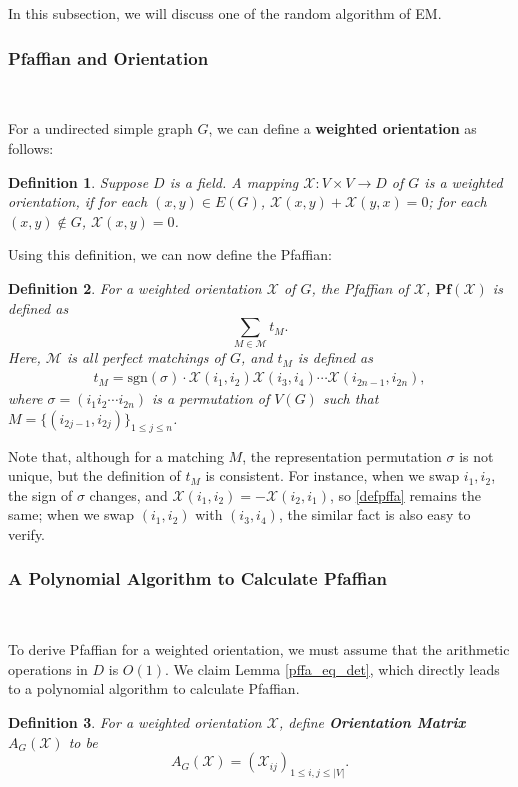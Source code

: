 \documentclass[11pt]{article}
\theoremstyle{plain}
\newtheorem{definition}{Definition}[section]
\begin{document}
In this subsection, we will discuss one of the random algorithm of EM.

\subsubsection{Pfaffian and Orientation}\

For a undirected simple graph $G$, we can define a \textbf{weighted orientation} as follows:

\begin{definition}
Suppose $D$ is a field. A mapping $\mathcal{X}:V\times V\to D$ of $G$ is a weighted orientation, if for each $(x,y)\in E(G)$, $\mathcal{X}(x,y)+\mathcal{X}(y,x)=0$; for each $(x,y)\not\in G$, $\mathcal{X}(x,y)=0$.
\end{definition}
Using this definition, we can now define the Pfaffian:

\begin{definition}
For a weighted orientation $\mathcal{X}$ of $G$, the Pfaffian of $\mathcal{X}$, $\mathbf{Pf}(\mathcal{X})$ is defined as
$$\sum\limits_{M\in \mathcal{M}} t_M.$$
Here, $\mathcal{M}$ is all perfect matchings of $G$, and $t_M$ is defined as
\begin{align}
t_M=\mathrm{sgn}(\sigma)\cdot \mathcal{X}(i_1,i_2)\mathcal{X}(i_3,i_4)\cdots \mathcal{X}(i_{2n-1},i_{2n}), \label{defpffa}
\end{align}
where $\sigma=(i_1i_2\cdots i_{2n})$ is a permutation of $V(G)$ such that $M=\{(i_{2j-1},i_{2j})\}_{1\le j\le n}$.
\end{definition}
Note that, although for a matching $M$, the representation permutation $\sigma$ is not unique, but the definition of $t_M$ is consistent. For instance, when we swap $i_1,i_2$, the sign of $\sigma$ changes, and $\mathcal{X}(i_1,i_2)=-\mathcal{X}(i_2,i_1)$, so \eqref{defpffa} remains the same; when we swap $(i_1,i_2)$ with $(i_3,i_4)$, the similar fact is also easy to verify.

\subsubsection{A Polynomial Algorithm to Calculate Pfaffian}\

To derive Pfaffian for a weighted orientation, we must assume that the arithmetic operations in $D$ is $O(1)$. We claim Lemma \ref{pffa_eq_det}, which directly leads to a polynomial algorithm to calculate Pfaffian.

\begin{definition}
For a weighted orientation $\mathcal{X}$, define \textbf{Orientation Matrix} $A_G(\mathcal{X})$ to be
$$A_G(\mathcal{X})=(\mathcal{X}_{ij})_{1\le i,j\le |V|}.$$
\end{definition}
\end{document}
